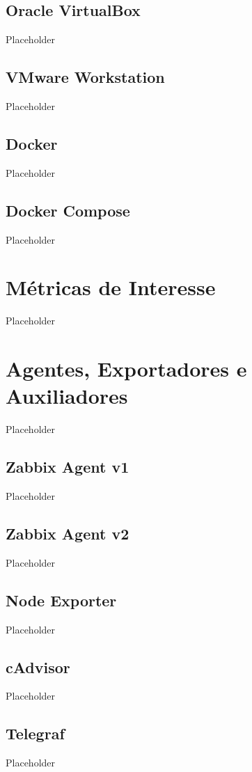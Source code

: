\subsection{Oracle VirtualBox}
Placeholder

\subsection{VMware Workstation}
Placeholder

\subsection{Docker}
Placeholder

\subsection{Docker Compose}
Placeholder

\section{Métricas de Interesse}
Placeholder

\section{Agentes, Exportadores e Auxiliadores}
Placeholder

\subsection{Zabbix Agent v1}
Placeholder

\subsection{Zabbix Agent v2}
Placeholder

\subsection{Node Exporter}
Placeholder

\subsection{cAdvisor}
Placeholder

\subsection{Telegraf}
Placeholder

